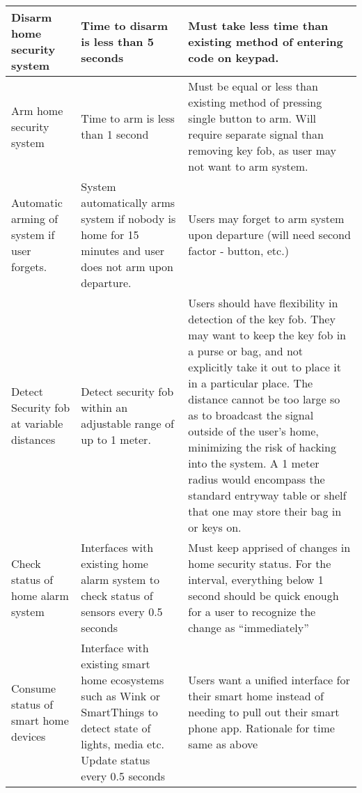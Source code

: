 \begin{center}
\tablelasttail{\hline}
\begin{supertabular}{| p{32mm} | p{50mm} | p{53mm} | }
		\hline Disarm home security system & Time to disarm is less than 5 seconds & Must take less time than existing method of entering code on keypad.\\
		\hline Arm home security system & Time to arm is less than 1 second & Must be equal or less than existing method of pressing single button to arm. Will require separate signal than removing key fob, as user may not want to arm system.\\ 
		\hline Automatic arming of system if user forgets. & System automatically arms system if nobody is home for 15 minutes and user does not arm upon departure. & Users may forget to arm system upon departure (will need second factor - button, etc.) \\ 
		\hline  Detect Security fob at variable distances & Detect security fob within an adjustable range of up to 1 meter. & Users should have flexibility in detection of the key fob. They may want to keep the key fob in a purse or bag, and not explicitly take it out to place it in a particular place. The distance cannot be too large so as to broadcast the signal outside of the user's home, minimizing the risk of hacking into the system. A 1 meter radius would encompass the standard entryway table or shelf that one may store their bag in or keys on.\\ 
        \hline Check status of home alarm system & Interfaces with existing home alarm system to check status of sensors every 0.5 seconds & Must keep apprised of changes in home security status. For the interval, everything below 1 second should be quick enough for a user to recognize the change as ``immediately'' \\
        \hline Consume status of smart home devices & Interface with existing smart home ecosystems such as Wink or SmartThings to detect state of lights, media etc. Update status every 0.5 seconds & Users want a unified interface for their smart home instead of needing to pull out their smart phone app. Rationale for time same as above\\

\end{supertabular}
\end{center}
